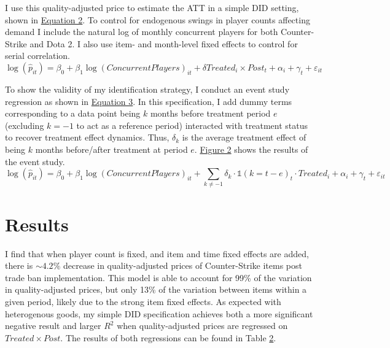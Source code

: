 \documentclass[12pt,letterpaper]{article}
\begin{document}
I use this quality-adjusted price to estimate the ATT in a simple DID setting, shown in \hyperref[eq:did]{Equation 2}. To control for endogenous swings in player counts affecting demand I include the natural log of monthly concurrent players for both Counter-Strike and Dota 2. I also use item- and month-level fixed effects to control for serial correlation. \\ 
\vspace{-5mm}
\begin{equation}
    \log(\hat{p}_{it}) = \beta_0 + \beta_1 \log(ConcurrentPlayers)_{it} + \delta Treated_i\times Post_t + \alpha_i + \gamma_t + \varepsilon_{it} \label{eq:did}
\end{equation}

To show the validity of my identification strategy, I conduct an event study regression as shown in \hyperref[eq:event_study]{Equation 3}. In this specification, I add dummy terms corresponding to a data point being \(k\) months before treatment period \(e\) (excluding \(k=-1\) to act as a reference period) interacted with treatment status to recover treatment effect dynamics. Thus, \(\delta_k\) is the average treatment effect of being \(k\) months before/after treatment at period \(e\). \hyperref[fig:event_study]{Figure 2} shows the results of the event study. \\

\vspace{-10mm}
\begin{equation}
\log(\hat{p}_{it}) = \beta_0 + \beta_1 \log(ConcurrentPlayers)_{it} + \sum_{k\neq-1}\delta_{k}\cdot\mathds{1}(k=t-e)_{t}\cdot Treated_{i} + \alpha_i + \gamma_t + \varepsilon_{it} \label{eq:event_study}
\end{equation}

\section{Results}
I find that when player count is fixed, and item and time fixed effects are added, there is \(\sim 4.2\%\) decrease in quality-adjusted prices of Counter-Strike items post trade ban implementation. This model is able to account for 99\% of the variation in quality-adjusted prices, but only 13\% of the variation between items within a given period, likely due to the strong item fixed effects. As expected with heterogenous goods, my simple DID specification achieves both a more significant negative result and larger \(R^2\) when quality-adjusted prices are regressed on \(Treated \times Post\). The results of both regressions can be found in Table \hyperref[tab:phat_reg]{2}. \\
\end{document}
